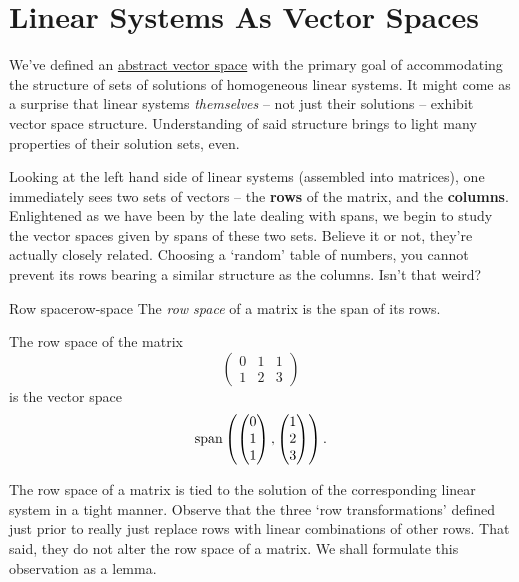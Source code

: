 \section{Linear Systems As Vector Spaces}
\label{sec:linear-systems-as-vector-spaces}

We've defined an \hyperref[def:abstract-vector-space]{abstract vector space}
with the primary goal of accommodating the structure of sets of solutions of
homogeneous linear systems. It might come as a surprise that linear systems
\emph{themselves} -- not just their solutions -- exhibit vector space structure.
Understanding of said structure brings to light many properties of their
solution sets, even.

Looking at the left hand side of linear systems (assembled into matrices), one
immediately sees two sets of vectors -- the \textbf{rows} of the matrix, and the
\textbf{columns}. Enlightened as we have been by the late
 dealing with spans, we begin to study
the vector spaces given by spans of these two sets. Believe it or not, they're
actually closely related. Choosing a `random' table of numbers, you cannot
prevent its rows bearing a similar structure as the columns. Isn't that weird?

\begin{definition}{Row space}{row-space}
 The \emph{row space} of a matrix is the span of its rows.
\end{definition}

\begin{example}{}{}
 The row space of the matrix
 \[
  \begin{pmatrix}
   0 & 1 & 1\\
   1 & 2 & 3
  \end{pmatrix}
 \]
 is the vector space
 \[
  \operatorname{span} \left( 
  \begin{pmatrix}
   0\\
   1\\
   1
  \end{pmatrix},
  \begin{pmatrix}
   1\\
   2\\
   3
  \end{pmatrix}
 \right).
 \]
\end{example}

The row space of a matrix is tied to the solution of the corresponding linear
system in a tight manner. Observe that the three `row transformations' defined
just prior to  really just replace rows with
linear combinations of other rows. That said, they do not alter the row space of
a matrix. We shall formulate this observation as a lemma.

